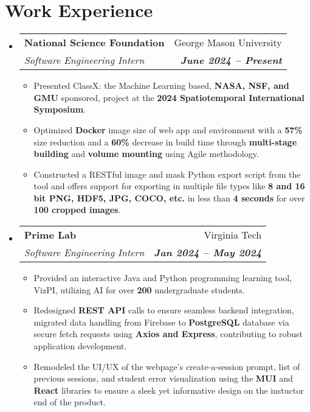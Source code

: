 \documentclass[letterpaper, 10pt]{article}
\makeatletter
\newcommand{\resumeItem}[1]{
  \item\small{
    {#1 \vspace{-2pt}}
  }
}
\newcommand{\resumeSubheading}[4]{
  \vspace{-2pt}\item
    \begin{tabular*}{0.97\textwidth}[t]{l@{\extracolsep{\fill}}r}
      \textbf{#1} & #2 \\
      \textit{\small#3} & \textit{\textbf{\small #4}} \\
    \end{tabular*}\vspace{-7pt}
}
\newcommand{\resumeSubHeadingListStart}{\begin{itemize}[leftmargin=0.15in, label={}]}
\newcommand{\resumeSubHeadingListEnd}{\end{itemize}}
\newcommand{\resumeItemListStart}{\begin{itemize}}
\newcommand{\resumeItemListEnd}{\end{itemize}\vspace{-5pt}}
\makeatother
\begin{document}
\section{Work Experience}
    \vspace{3pt}
    \resumeSubHeadingListStart

	\resumeSubheading
		{National Science Foundation}{George Mason University}
		{Software Engineering Intern}{June 2024 \textbf{--} Present}
	\resumeItemListStart
		\resumeItem{Presented ClassX: the Machine Learning based, \textbf{NASA, NSF, and GMU} sponsored, project at the \textbf{2024 Spatiotemporal International Symposium}.}
		\resumeItem{Optimized \textbf{Docker} image size of web app and environment with a \textbf{57\%} size reduction and a \textbf{60\%} decrease in build time through \textbf{multi-stage building} and \textbf{volume mounting} using Agile methodology.} 
		\resumeItem{Constructed a RESTful image and mask Python export script from the tool and offers support for exporting in multiple file types like \textbf{8 and 16 bit PNG, HDF5, JPG, COCO, etc.} in less than \textbf{4 seconds} for over \textbf{100 cropped images}.}
	 \resumeItemListEnd
	
	\resumeSubheading
		{Prime Lab}{Virginia Tech}
		{Software Engineering Intern}{Jan 2024 \textbf{--} May 2024}

	  \resumeItemListStart
		\resumeItem{Provided an interactive Java and Python programming learning tool, VizPI, utilizing AI for over \textbf{200} undergraduate students.}
		\resumeItem{Redesigned \textbf{REST API} calls to ensure seamless backend integration, migrated data handling from Firebase to \textbf{PostgreSQL} database via secure fetch requests using \textbf{Axios and Express}, contributing to robust application development.}
		\resumeItem{Remodeled the UI/UX of the webpage's create-a-session prompt, list of previous sessions, and student error visualization using the \textbf{MUI} and \textbf{React} libraries to ensure a sleek yet informative design on the instuctor end of the product.}
	 \resumeItemListEnd
	
\resumeSubHeadingListEnd
\end{document}
